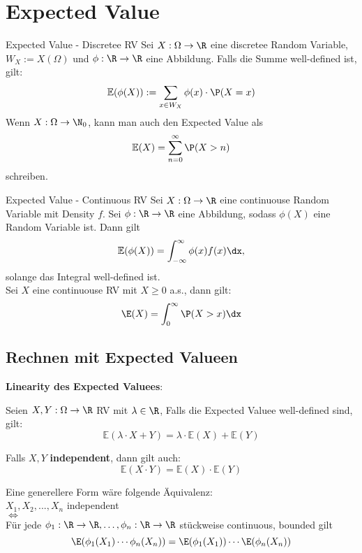 \section{Expected Value}
\begin{mainbox}{Expected Value - Discretee RV}
    Sei $X: \Omega \to \R$ eine discretee Random Variable, $W_X := X(\Omega)$ und $\phi: \R \to \R$ eine Abbildung. Falls die Summe well-defined ist, gilt: 
    $$\mathbb{E}(\phi(X)) := \sum_{x \in W_X} \phi(x) \cdot \P(X = x)$$
    Wenn $X: \Omega \to \N_0$, kann man auch den Expected Value als
    $$\mathbb{E}(X) = \sum_{n = 0}^{\infty}\P(X > n)$$
    schreiben.
\end{mainbox}
\begin{mainbox}{Expected Value - Continuous RV}
    Sei $X: \Omega \to \R$ eine continuouse Random Variable mit Density $f$. Sei $\phi: \R \to \R$ eine Abbildung, sodass $\phi(X)$ eine Random Variable ist. Dann gilt
    $$\mathbb{E}(\phi(X))= \int_{-\infty}^\infty \phi(x)f(x)\dx,$$
    solange das Integral well-defined ist.
    \\Sei $X$ eine continuouse RV mit $X \geq 0$ a.s., dann gilt:
    $$\E(X)=\int_0^\infty \P(X > x)\dx$$ 
\end{mainbox}

\subsection{Rechnen mit Expected Valueen}
\textbf{Linearity des Expected Valuees}: 

Seien $X, Y: \Omega \to \R$ RV mit $\lambda \in \R$, Falls die Expected Valuee well-defined sind, gilt:
$$\mathbb{E}(\lambda \cdot X + Y) = \lambda \cdot \mathbb{E}(X) + \mathbb{E}(Y)$$

Falls $X, Y$ \textbf{independent}, dann gilt auch:
$$\mathbb{E}(X \cdot Y) = \mathbb{E}(X) \cdot \mathbb{E}(Y)$$

Eine generellere Form wäre folgende Äquivalenz:\\
$X_1, X_2, ...,X_n$ independent
\\$\iff$
\\Für jede $\phi_1: \R \to \R, \ldots, \phi_n: \R \to \R$ stückweise continuous, bounded gilt
$$\E(\phi_1(X_1)\cdots\phi_n(X_n))=\E(\phi_1(X_1))\cdots\E(\phi_n(X_n))$$ 

